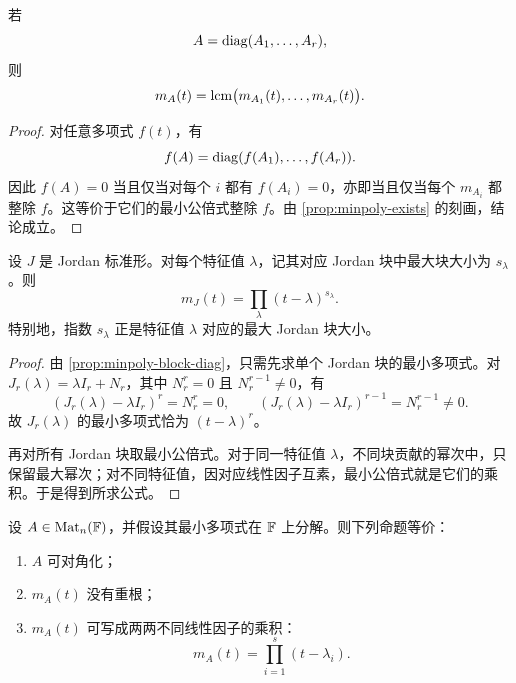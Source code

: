 \begin{proposition}\label{prop:minpoly-block-diag}
若
\[
A=\mathrm{diag}(A_1,\dots,A_r),
\]
则
\[
m_A(t)=\operatorname{lcm}\bigl(m_{A_1}(t),\dots,m_{A_r}(t)\bigr).
\]
\end{proposition}

\begin{proof}
对任意多项式 \(f(t)\)，有
\[
f(A)=\mathrm{diag}(f(A_1),\dots,f(A_r)).
\]
因此 \(f(A)=0\) 当且仅当对每个 \(i\) 都有 \(f(A_i)=0\)，亦即当且仅当每个 \(m_{A_i}\) 都整除 \(f\)。这等价于它们的最小公倍式整除 \(f\)。由 \cref{prop:minpoly-exists} 的刻画，结论成立。
\end{proof}

\begin{proposition}\label{prop:minpoly-jordan}
设 \(J\) 是 Jordan 标准形。对每个特征值 \(\lambda\)，记其对应 Jordan 块中最大块大小为 \(s_\lambda\)。则
\[
m_J(t)=\prod_{\lambda}(t-\lambda)^{s_\lambda}.
\]
特别地，指数 \(s_\lambda\) 正是特征值 \(\lambda\) 对应的最大 Jordan 块大小。
\end{proposition}

\begin{proof}
由 \cref{prop:minpoly-block-diag}，只需先求单个 Jordan 块的最小多项式。对 \(J_r(\lambda)=\lambda I_r+N_r\)，其中 \(N_r^r=0\) 且 \(N_r^{r-1}\neq 0\)，有
\[
(J_r(\lambda)-\lambda I_r)^r=N_r^r=0,
\qquad (J_r(\lambda)-\lambda I_r)^{r-1}=N_r^{r-1}\neq 0.
\]
故 \(J_r(\lambda)\) 的最小多项式恰为 \((t-\lambda)^r\)。

再对所有 Jordan 块取最小公倍式。对于同一特征值 \(\lambda\)，不同块贡献的幂次中，只保留最大幂次；对不同特征值，因对应线性因子互素，最小公倍式就是它们的乘积。于是得到所求公式。
\end{proof}

\begin{theorem}\label{thm:minpoly-diag-criterion}
设 \(A\in \mathrm{Mat}_n(\mathbb{F})\)，并假设其最小多项式在 \(\mathbb{F}\) 上分解。则下列命题等价：
\begin{enumerate}[label=(\arabic*), leftmargin=2.4em]
  \item \(A\) 可对角化；
  \item \(m_A(t)\) 没有重根；
  \item \(m_A(t)\) 可写成两两不同线性因子的乘积：
  \[
  m_A(t)=\prod_{i=1}^s (t-\lambda_i).
  \]
\end{enumerate}
\end{theorem}

